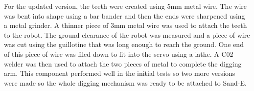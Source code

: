         For the updated version, the teeth were created using 5mm metal wire. The wire was bent into shape using a bar bander and then           the ends were sharpened using a metal grinder. A thinner piece of 3mm metal wire was used to attach the teeth to the robot. The          ground clearance of the robot was measured and a piece of wire was cut using the guillotine that was long enough to reach the            ground. One end of this piece of wire was filed down to fit into the servo using a lathe. A C02 welder was then used to attach           the two pieces of metal to complete the digging arm. This component performed well in the initial tests so two more versions were         made so the whole digging mechanism was ready to be attached to Sand-E.






